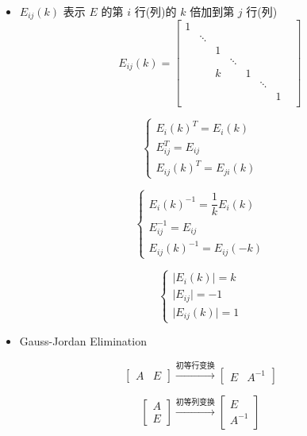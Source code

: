 \begin{definition}[初等矩阵]
\begin{itemize}
		\item $E_{ij}(k)$ 表示 $E$ 的第 $i$ 行(列)的 $k$ 倍加到第 $j$ 行(列)
		$$E_{ij}(k) = \begin{bmatrix}
			1 &        &   &        &   &        &   &\\
			  & \ddots &   &        &   &        &   &\\
			  &        & 1 &        &   &        &   &\\
			  &        &   & \ddots &   &        &   &\\
			  &        & k &        & 1 &        &   &\\
			  &        &   &        &   & \ddots &   &\\
			  &        &   &        &   &        & 1 &\\
		\end{bmatrix}$$
	\end{itemize}
\end{definition}
\begin{corollary}[初等矩阵推论]
	$$\begin{cases}
	  E_{i}(k)^{T} = E_{i}(k)\\
	  E_{ij}^{T} = E_{ij}\\
	  E_{ij}(k)^{T} = E_{ji}(k)
	\end{cases}$$

	$$\begin{cases}
	  E_{i}(k)^{-1} = \dfrac{1}{k}E_{i}(k)\\
	  E_{ij}^{-1} = E_{ij}\\
	  E_{ij}(k)^{-1} = E_{ij}(-k)
	\end{cases}$$

	$$\begin{cases}
	  \big|E_{i}(k)\big| = k\\
	  \big|E_{ij}\big| = -1\\
	  \big|E_{ij}(k)\big| = 1
	\end{cases}$$

	\begin{itemize}
		\item \textcolor{purplec}{Gauss-Jordan Elimination}
	\end{itemize}
	
	$$\begin{bmatrix}
		A & E
	\end{bmatrix}\xrightarrow{\text{初等行变换}}
	\begin{bmatrix}
		E & A^{-1}
	\end{bmatrix}$$

	$$\begin{bmatrix}
		A\\E
	\end{bmatrix}\xrightarrow{\text{初等列变换}}
	\begin{bmatrix}
		E\\A^{-1}
	\end{bmatrix}$$
\end{corollary}

